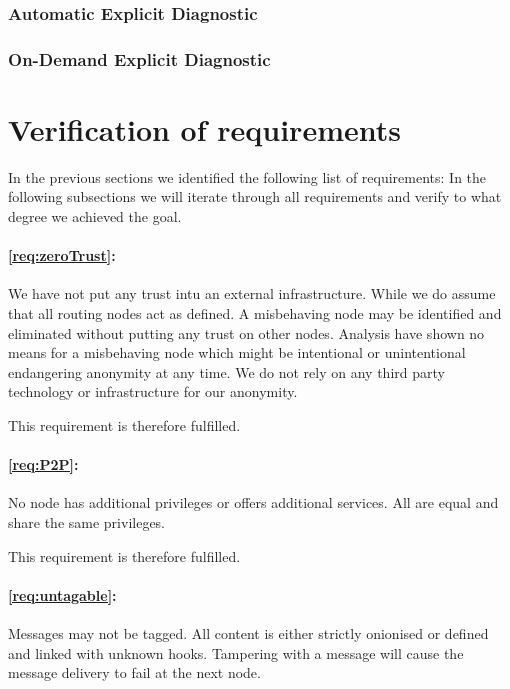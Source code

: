 \subsubsection{Automatic Explicit Diagnostic}

\subsubsection{On-Demand Explicit Diagnostic}

\section{Verification of requirements}
In the previous sections we identified the following list of requirements:
\slistofrequirements
In the following subsections we will iterate through all requirements and verify to what degree we achieved the goal.


\paragraph{\ref{req:zeroTrust}:} 
We have not put any trust intu an external infrastructure. While we do assume that all routing nodes act as defined. A misbehaving node may be identified and eliminated without putting any trust on other nodes. Analysis have shown no means for a misbehaving node which might be intentional or unintentional endangering anonymity at any time. We do not rely on any third party technology or infrastructure for our anonymity. 

This requirement is therefore fulfilled.

\paragraph{\ref{req:P2P}:} 
No node has additional privileges or offers additional services. All are equal and share the same privileges.

This requirement is therefore fulfilled.

\paragraph{\ref{req:untagable}:} 
Messages may not be tagged. All content is either strictly onionised or defined and linked with unknown hooks. Tampering with a message will cause the message delivery to fail at the next node.


